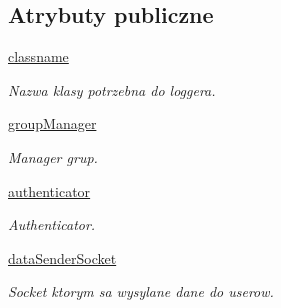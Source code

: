 \subsection*{Atrybuty publiczne}
\begin{DoxyCompactItemize}
\item 
\hypertarget{class_serv_1_1_parser_1_1_parser_a98309dc29b98b9dbbaba8175bc6fce00}{
\hyperlink{class_serv_1_1_parser_1_1_parser_a98309dc29b98b9dbbaba8175bc6fce00}{classname}}
\label{class_serv_1_1_parser_1_1_parser_a98309dc29b98b9dbbaba8175bc6fce00}

\begin{DoxyCompactList}\small\item\em Nazwa klasy potrzebna do loggera. \item\end{DoxyCompactList}\item 
\hypertarget{class_serv_1_1_parser_1_1_parser_a8e8fc28fb138a84f24593294eba5a237}{
\hyperlink{class_serv_1_1_parser_1_1_parser_a8e8fc28fb138a84f24593294eba5a237}{groupManager}}
\label{class_serv_1_1_parser_1_1_parser_a8e8fc28fb138a84f24593294eba5a237}

\begin{DoxyCompactList}\small\item\em Manager grup. \item\end{DoxyCompactList}\item 
\hypertarget{class_serv_1_1_parser_1_1_parser_a59f3263667252c32bbe04baf2db0c12e}{
\hyperlink{class_serv_1_1_parser_1_1_parser_a59f3263667252c32bbe04baf2db0c12e}{authenticator}}
\label{class_serv_1_1_parser_1_1_parser_a59f3263667252c32bbe04baf2db0c12e}

\begin{DoxyCompactList}\small\item\em Authenticator. \item\end{DoxyCompactList}\item 
\hypertarget{class_serv_1_1_parser_1_1_parser_adb376d9d8d99afa93fa43b3ca8153e9f}{
\hyperlink{class_serv_1_1_parser_1_1_parser_adb376d9d8d99afa93fa43b3ca8153e9f}{dataSenderSocket}}
\label{class_serv_1_1_parser_1_1_parser_adb376d9d8d99afa93fa43b3ca8153e9f}

\begin{DoxyCompactList}\small\item\em Socket ktorym sa wysylane dane do userow. \item\end{DoxyCompactList}\end{DoxyCompactItemize}


